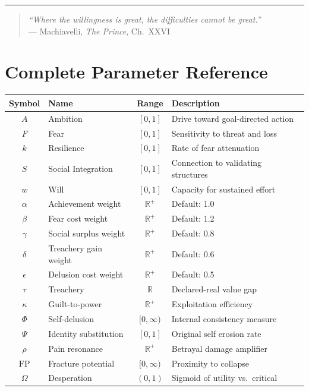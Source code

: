 \documentclass[12pt, a4paper]{article}
\theoremstyle{remark}
\newcommand{\R}{\mathbb{R}}
\begin{document}
\vspace{1cm}
\begin{center}
\rule{5cm}{0.5pt}
\end{center}

\begin{quote}
\centering
\textit{``Where the willingness is great, the difficulties cannot be great.''}\\
--- Machiavelli, \textit{The Prince}, Ch.\ XXVI
\end{quote}

\vfill


\appendix

\section{Complete Parameter Reference}

\begin{center}
\renewcommand{\arraystretch}{1.4}
\begin{tabular}{|c|l|c|l|}
\hline
\textbf{Symbol} & \textbf{Name} & \textbf{Range} & \textbf{Description} \\
\hline
$A$ & Ambition & $[0,1]$ & Drive toward goal-directed action \\
$F$ & Fear & $[0,1]$ & Sensitivity to threat and loss \\
$k$ & Resilience & $[0,1]$ & Rate of fear attenuation \\
$S$ & Social Integration & $[0,1]$ & Connection to validating structures \\
$w$ & Will & $[0,1]$ & Capacity for sustained effort \\
\hline
$\alpha$ & Achievement weight & $\R^+$ & Default: 1.0 \\
$\beta$ & Fear cost weight & $\R^+$ & Default: 1.2 \\
$\gamma$ & Social surplus weight & $\R^+$ & Default: 0.8 \\
$\delta$ & Treachery gain weight & $\R^+$ & Default: 0.6 \\
$\epsilon$ & Delusion cost weight & $\R^+$ & Default: 0.5 \\
\hline
$\tau$ & Treachery & $\R$ & Declared-real value gap \\
$\kappa$ & Guilt-to-power & $\R^+$ & Exploitation efficiency \\
$\Phi$ & Self-delusion & $[0,\infty)$ & Internal consistency measure \\
$\Psi$ & Identity substitution & $[0,1]$ & Original self erosion rate \\
$\rho$ & Pain resonance & $\R^+$ & Betrayal damage amplifier \\
$\text{FP}$ & Fracture potential & $[0,\infty)$ & Proximity to collapse \\
$\Omega$ & Desperation & $(0,1)$ & Sigmoid of utility vs.\ critical \\
\hline
\end{tabular}
\end{center}
\end{document}

